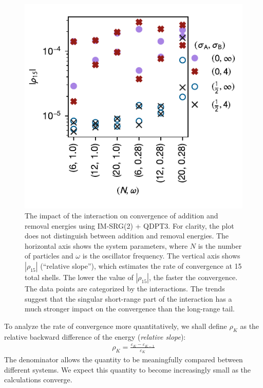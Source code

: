 \begin{figure}
  \centering
  \includegraphics{fig-rel-slopes2}
  \caption{The impact of the interaction on convergence of addition and removal energies using IM-SRG(2) + QDPT3.  For clarity, the plot does not distinguish between addition and removal energies.  The horizontal axis shows the system parameters, where $N$ is the number of particles and $\omega$ is the oscillator frequency.  The vertical axis shows $|\rho_{15}|$ (``relative slope''), which estimates the rate of convergence at 15 total shells.  The lower the value of $|\rho_{15}|$, the faster the convergence.  The data points are categorized by the interactions.  The trends suggest that the singular short-range part of the interaction has a much stronger impact on the convergence than the long-range tail.}
  \label{fig:rel-slopes}
\end{figure}

To analyze the rate of convergence more quantitatively, we shall define $\rho_K$ as the relative backward difference of the energy (\textit{relative slope}):
\begin{align*}
  \rho_K = \frac{\varepsilon_{K} - \varepsilon_{K - 1}}{\varepsilon_K}
\end{align*}
The denominator allows the quantity to be meaningfully compared between different systems.  We expect this quantity to become increasingly small as the calculations converge.

